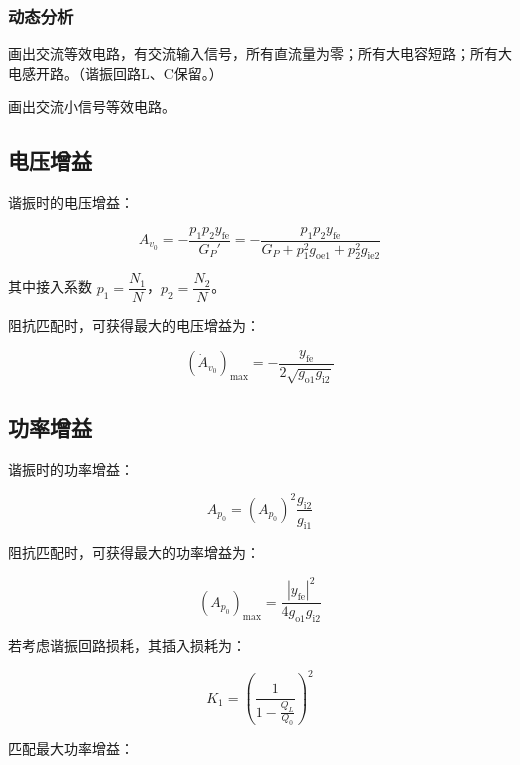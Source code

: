 \subsubsection{动态分析}

画出交流等效电路，有交流输入信号，所有直流量为零；所有大电容短路；所有大电感开路。（谐振回路L、C保留。）

画出交流小信号等效电路。

\subsection{电压增益}

谐振时的电压增益：

\begin{equation}
    A_{v_0} = - \frac{p_1 p_2 y_{\text{fe}}}{G_P'} 
    = - \frac{p_1 p_2 y_{\text{fe}}}{G_P + p_1^2 g_{\text{oe}1} + p_2^2 g_{\text{ie}2}}
\end{equation}

其中接入系数 $p_1 = \dfrac{N_1}{N}$，$p_2 = \dfrac{N_2}{N}$。

阻抗匹配时，可获得最大的电压增益为：

\begin{equation}
    (\dot{A}_{v_0})_{\text{max}} = - \frac{y_{\text{fe}}}{2\sqrt{g_{\text{o}1} g_{\text{i}2}}}
\end{equation}

\subsection{功率增益}

谐振时的功率增益：

\begin{equation}
    A_{p_0} = (A_{p_0})^2 \frac{g_{\text{i}2}}{g_{\text{i}1}}
\end{equation}

阻抗匹配时，可获得最大的功率增益为：

\begin{equation}
    (A_{p_0})_{\text{max}} = \frac{|y_{\text{fe}}|^2}{4 g_{\text{o}1} g_{\text{i}2}}
\end{equation}

若考虑谐振回路损耗，其插入损耗为：

\begin{equation}
    K_1 = \left(\frac{1}{1 - \frac{Q_L}{Q_0}}\right)^2
\end{equation}

匹配最大功率增益：

